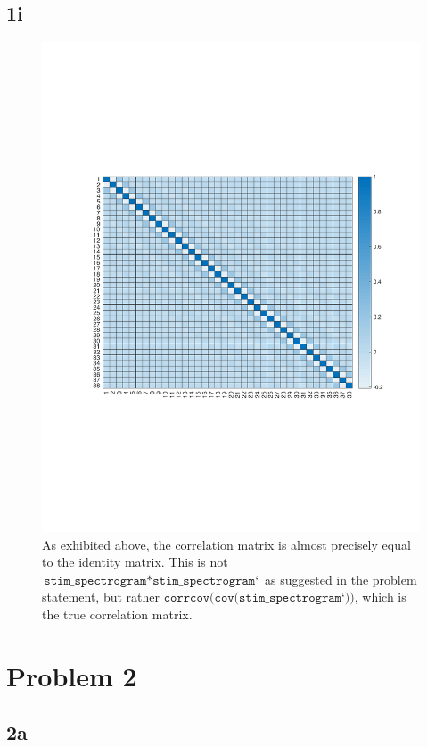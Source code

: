 \documentclass[]{article}
\begin{document}
\subsection*{1i}

\begin{figure}[H]
    \centering
    \includegraphics[width=0.8\linewidth]{problem1i.pdf}
    \caption{As exhibited above, the correlation matrix is almost precisely equal to the identity matrix. This is not $\texttt{stim\_spectrogram}*\texttt{stim\_spectrogram`}$ as suggested in the problem statement, but rather $\texttt{corrcov(cov(stim\_spectrogram`))}$, which is the true correlation matrix.}
    \label{fig:my_label}
\end{figure}

\section*{Problem 2}

\subsection*{2a}
\end{document}
